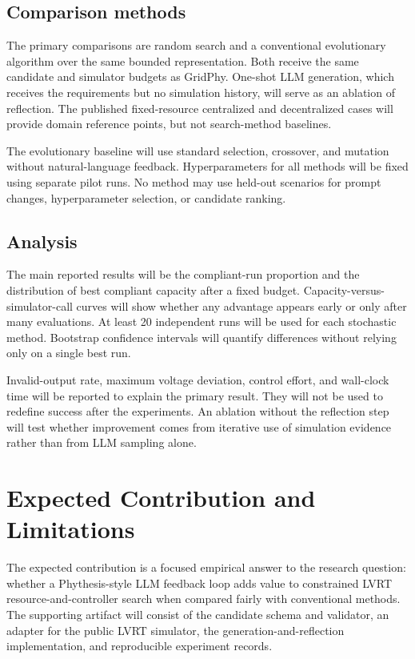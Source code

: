 \documentclass[11pt,a4paper]{article}
\begin{document}
\subsection{Comparison methods}

The primary comparisons are random search and a conventional evolutionary algorithm over the same bounded representation. Both receive the same candidate and simulator budgets as GridPhy. One-shot LLM generation, which receives the requirements but no simulation history, will serve as an ablation of reflection. The published fixed-resource centralized and decentralized cases will provide domain reference points, but not search-method baselines.

The evolutionary baseline will use standard selection, crossover, and mutation without natural-language feedback. Hyperparameters for all methods will be fixed using separate pilot runs. No method may use held-out scenarios for prompt changes, hyperparameter selection, or candidate ranking.

\subsection{Analysis}

The main reported results will be the compliant-run proportion and the distribution of best compliant capacity after a fixed budget. Capacity-versus-simulator-call curves will show whether any advantage appears early or only after many evaluations. At least 20 independent runs will be used for each stochastic method. Bootstrap confidence intervals will quantify differences without relying only on a single best run.

Invalid-output rate, maximum voltage deviation, control effort, and wall-clock time will be reported to explain the primary result. They will not be used to redefine success after the experiments. An ablation without the reflection step will test whether improvement comes from iterative use of simulation evidence rather than from LLM sampling alone.

\section{Expected Contribution and Limitations}

The expected contribution is a focused empirical answer to the research question: whether a Phythesis-style LLM feedback loop adds value to constrained LVRT resource-and-controller search when compared fairly with conventional methods. The supporting artifact will consist of the candidate schema and validator, an adapter for the public LVRT simulator, the generation-and-reflection implementation, and reproducible experiment records.
\end{document}
